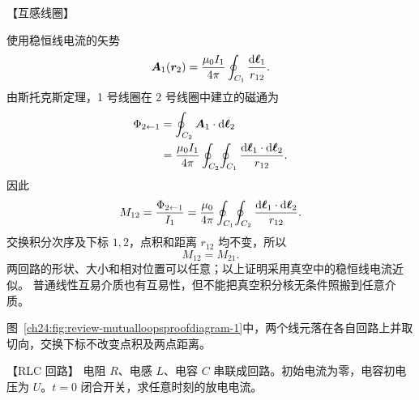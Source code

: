 {\begin{origexamplebox}{【互感线圈】}
\end{origexamplebox}

\begin{xesolution}
\par\noindent\begin{minipage}{\linewidth}
\mutualLoopsProofDiagram
{}
\end{minipage}\par\medskip

使用稳恒线电流的矢势
\begin{equation}
  \bm{A}_1(\bm{r}_2)=\frac{\mu_0I_1}{4\pi}
  \oint_{C_1}\frac{\mathop{}\!\mathrm d\bm{\ell}_1}{r_{12}}.
\end{equation}
由斯托克斯定理，1 号线圈在 2 号线圈中建立的磁通为
\begin{align}
  \Phi_{2\leftarrow1}
  &=\oint_{C_2}\bm{A}_1\cdot\mathop{}\!\mathrm d\bm{\ell}_2\\
  &=\frac{\mu_0I_1}{4\pi}\oint_{C_2}\!\oint_{C_1}
  \frac{\mathop{}\!\mathrm d\bm{\ell}_1\cdot\mathop{}\!\mathrm d\bm{\ell}_2}{r_{12}}.
\end{align}
因此
\begin{equation}
  M_{12}=\frac{\Phi_{2\leftarrow1}}{I_1}
  =\frac{\mu_0}{4\pi}\oint_{C_1}\!\oint_{C_2}
  \frac{\mathop{}\!\mathrm d\bm{\ell}_1\cdot\mathop{}\!\mathrm d\bm{\ell}_2}{r_{12}}.
\end{equation}
交换积分次序及下标 $1,2$，点积和距离 $r_{12}$ 均不变，所以
\begin{equation}
  \boxed{M_{12}=M_{21}}.
\end{equation}
两回路的形状、大小和相对位置可以任意；以上证明采用真空中的稳恒线电流近似。
普通线性互易介质也有互易性，但不能把真空积分核无条件照搬到任意介质。

图~\ref{ch24:fig:review-mutualloopsproofdiagram-1}中，两个线元落在各自回路上并取切向，交换下标不改变点积及两点距离。

\end{xesolution}



\begin{origexamplebox}{【RLC 回路】}\label{ch24:ex:s40-9-19}
电阻 $R$、电感 $L$、电容 $C$ 串联成回路。初始电流为零，电容初电压为 $U$。$t=0$ 闭合开关，求任意时刻的放电电流。
\par\noindent\begin{minipage}{\linewidth}
\end{minipage}\par\medskip
\end{origexamplebox}

}
